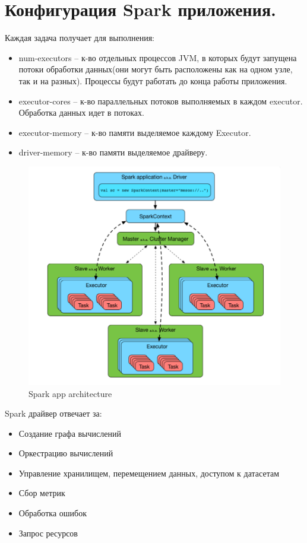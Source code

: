 \section{Конфигурация Spark приложения.}

Каждая задача получает для выполнения:
\begin{itemize}
    \item num-executors – к-во отдельных процессов JVM, в которых будут
    запущена потоки обработки данных(они могут быть расположены
    как на одном узле, так и на разных). Процессы будут работать до
    конца работы приложения.
    \item executor-cores – к-во параллельных потоков выполняемых в
    каждом executor. Обработка данных идет в потоках.
    \item executor-memory – к-во памяти выделяемое каждому Executor.
    \item driver-memory – к-во памяти выделяемое драйверу.
\end{itemize}

\begin{figure}[H]
	\centering
	\begin{minipage}[b]{0.6\textwidth}
		\includegraphics[width=\textwidth]{images/sparkapp2.png}
		\caption{Spark app architecture}
	\end{minipage}
\end{figure}


Spark драйвер отвечает за:
\begin{itemize}
    \item Создание графа вычислений
    \item Оркестрацию вычислений
    \item Управление хранилищем, перемещением данных, доступом к датасетам
    \item Сбор метрик
    \item Обработка ошибок
    \item Запрос ресурсов
\end{itemize}


